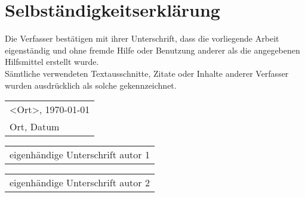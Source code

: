 \clearpage
\thispagestyle{empty}
\section*{Selbständigkeitserklärung}
Die Verfasser bestätigen mit ihrer Unterschrift, dass die vorliegende Arbeit eigenständig und ohne fremde Hilfe oder Benutzung anderer als die angegebenen Hilfsmittel erstellt wurde.\\Sämtliche verwendeten Textausschnitte, Zitate oder Inhalte anderer Verfasser wurden ausdrücklich als solche gekennzeichnet.

\vspace{2cm}
\begin{tabular}{@{}l@{}}
    <Ort>, \today\\
    Ort, Datum
\end{tabular}
\vspace{10cm}

\begin{tabular}{@{}l@{}}\hline
    eigenhändige Unterschrift autor 1
\end{tabular}
\vspace{2cm}

\begin{tabular}{@{}l@{}}\hline
    eigenhändige Unterschrift autor 2
\end{tabular}
\vspace{2cm}

\clearpage